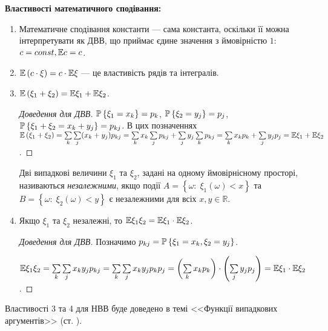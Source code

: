 \vspace{0.5em}
\noindent \textbf{Властивості математичного сподівання:}
\begin{enumerate}
    \item Математичне сподівання константи --- сама константа, оскільки
    її можна інтерпретувати як ДВВ, що приймає єдине значення з ймовірністю $1$:
    $c = const, \E c = c$.
    \item $\E \left(c\cdot\xi\right) = c\cdot \E\xi$ --- це властивість рядів та інтегралів.
    \item $\E\left( \xi_1 + \xi_2\right) = \E\xi_1 + \E\xi_2$.
    \begin{proof}[Доведення для ДВВ]
        $\P\left\{\xi_1 = x_k\right\} = p_k$, $\P\left\{\xi_2 = y_j\right\} = p_j$, $\P\left\{\xi_1 + \xi_2 = x_k + y_j\right\} = p_{kj}$.
        В цих позначеннях
        $\E\left( \xi_1 + \xi_2\right) = \sum\limits_k \sum\limits_j (x_k+y_j) p_{kj} =
        \sum\limits_k x_k \sum\limits_j p_{kj} + \sum\limits_j y_j \sum\limits_k p_{kj} = \sum\limits_k x_k p_k + \sum\limits_j y_j p_j = \E\xi_1 + \E\xi_2$.
    \end{proof}
\begin{definition}
    Дві випадкові величини $\xi_1$ та $\xi_2$, задані на одному ймовірнісному просторі, називаються \emph{незалежними}, якщо
    події $A=\left\{\omega : \; \xi_1(\omega) < x\right\}$ та
    $B=\left\{\omega : \; \xi_2(\omega) < y\right\}$ є незалежними для всіх $x, y \in \mathbb{R}$.
\end{definition}
\label{eq:EXY_indep}
    \item Якщо $\xi_1$ та $\xi_2$ незалежні, то $\E\xi_1\xi_2 = \E\xi_1 \cdot \E\xi_2$.
    \begin{proof}[Доведення для ДВВ]
        Позначимо $p_{kj} = \P\left\{\xi_1 = x_k, \xi_2 = y_j\right\}$.
        
        $\E\xi_1\xi_2 = \sum\limits_k \sum\limits_j x_k y_j p_{kj} = \sum\limits_k \sum\limits_j x_k y_j p_k p_j = \left( \sum\limits_k x_k p_k\right)\cdot \left( \sum\limits_j y_j p_j\right) = \E\xi_1 \cdot \E\xi_2$.
    \end{proof}
\end{enumerate}
\begin{remark}
    Властивості 3 та 4 для НВВ буде доведено в темі <<Функції випадкових аргументів>> (ст. \pageref{proof:expectation}).
\end{remark}

